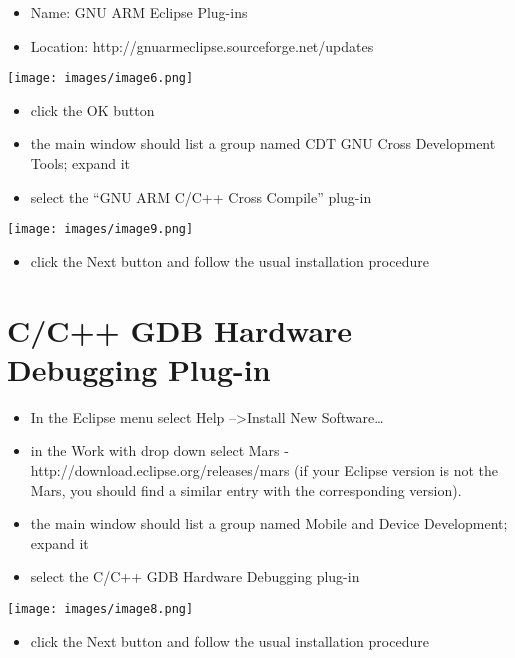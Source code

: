 \begin{itemize}
\tightlist
\item
  {Name: }{GNU ARM Eclipse Plug-ins}
\item
  {Location: }{http://gnuarmeclipse.sourceforge.net/updates}
\end{itemize}

{\texttt{[image: images/image6.png]}}

\begin{itemize}
\tightlist
\item
  {click the OK button}
\item
  {the main window should list a group named CDT GNU Cross Development
  Tools; expand it}
\item
  {select the ``GNU ARM C/C++ Cross Compile'' plug-in}
\end{itemize}

{\texttt{[image: images/image9.png]}}

\begin{itemize}
\tightlist
\item
  {click the Next button and follow the usual installation procedure}
\end{itemize}

\hypertarget{h.1t3h5sf}{\section{\texorpdfstring{{C/C++ GDB Hardware
Debugging
Plug-in}}{C/C++ GDB Hardware Debugging Plug-in}}\label{h.1t3h5sf}}

\begin{itemize}
\tightlist
\item
  {In the Eclipse menu select Help --\textgreater{}Install New
  Software\ldots{}}
\item
  {in the Work with drop down select Mars -
  http://download.eclipse.org/releases/mars (if your Eclipse version is
  not the Mars, you should find a similar entry with the corresponding
  version).}
\item
  {the main window should list a group named Mobile and Device
  Development; expand it}
\item
  {select the C/C++ GDB Hardware Debugging plug-in}
\end{itemize}

{\texttt{[image: images/image8.png]}}

\begin{itemize}
\tightlist
\item
  {click the Next button and follow the usual installation procedure}
\end{itemize}

